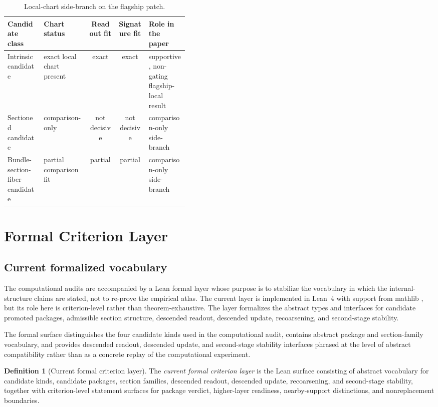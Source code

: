 \documentclass[11pt]{article}
\theoremstyle{definition}
\newtheorem{definition}[theorem]{Definition}
\begin{document}
\begin{table}[t]
\centering
\small
\begin{tabularx}{\linewidth}{@{}>{\raggedright\arraybackslash}p{0.20\linewidth}>{\raggedright\arraybackslash}X c c >{\raggedright\arraybackslash}p{0.22\linewidth}@{}}
\toprule
Candidate class & Chart status & Readout fit & Signature fit & Role in the paper \\
\midrule
Intrinsic candidate & exact local chart present & exact & exact & supportive, non-gating flagship-local result \\
Sectioned candidate & comparison-only & not decisive & not decisive & comparison-only side-branch \\
Bundle-section-fiber candidate & partial comparison fit & partial & partial & comparison-only side-branch \\
\bottomrule
\end{tabularx}
\caption{Local-chart side-branch on the flagship patch.}
\label{tab:local-chart}
\end{table}
 \section{Formal Criterion Layer}

\subsection{Current formalized vocabulary}

The computational audits are accompanied by a Lean formal layer whose purpose is to stabilize the vocabulary in which the internal-structure claims are stated, not to re-prove the empirical atlas. The current layer is implemented in Lean~4 with support from mathlib \cite{deMouraUllrich2021,MathlibCommunity2020}, but its role here is criterion-level rather than theorem-exhaustive. The layer formalizes the abstract types and interfaces for candidate promoted packages, admissible section structure, descended readout, descended update, recoarsening, and second-stage stability.

The formal surface distinguishes the four candidate kinds used in the computational audit, contains abstract package and section-family vocabulary, and provides descended readout, descended update, and second-stage stability interfaces phrased at the level of abstract compatibility rather than as a concrete replay of the computational experiment.

\begin{definition}[Current formal criterion layer]
\label{def:formal-layer}
The \emph{current formal criterion layer} is the Lean surface consisting of abstract vocabulary for candidate kinds, candidate packages, section families, descended readout, descended update, recoarsening, and second-stage stability, together with criterion-level statement surfaces for package verdict, higher-layer readiness, nearby-support distinctions, and nonreplacement boundaries.
\end{definition}
\end{document}
